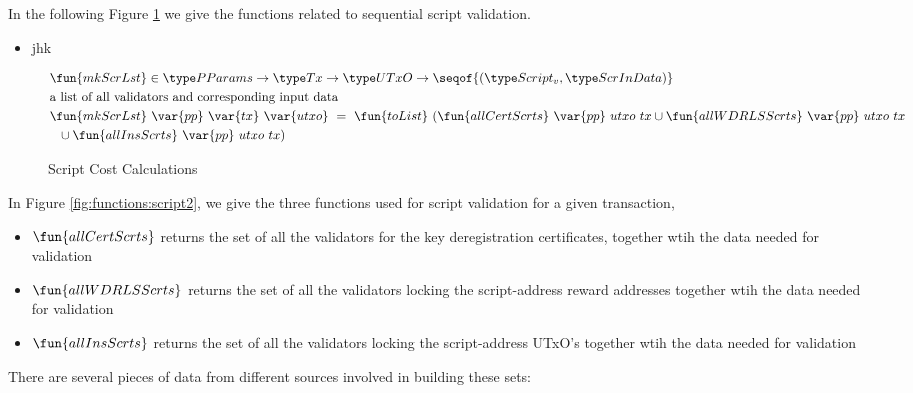 \clearpage

In the following Figure \ref{fig:functions:script1} we give the functions
related to sequential script validation.

\begin{itemize}
\item jhk
\end{itemize}

\begin{figure}[htb]
  \begin{align*}
    & \fun{mkScrLst} \in \PParams \to \Tx \to \UTxO \to \seqof{(\ScriptV,\ScrInData)} \\
    & \text{a list of all validators and corresponding input data} \\
    & \fun{mkScrLst} ~\var{pp}~\var{tx}~ \var{utxo} ~=~
    \fun{toList}~(\fun{allCertScrts}~\var{pp}~{utxo}~{tx} \cup \fun{allWDRLSScrts}~\var{pp}~{utxo}~{tx} \\
    & ~~ \cup \fun{allInsScrts}~\var{pp}~{utxo}~{tx}) \\
  \end{align*}
  \caption{Script Cost Calculations}
  \label{fig:functions:script1}
\end{figure}

In Figure \ref{fig:functions:script2}, we give the three functions
used for script validation for a given transaction,

\begin{itemize}
\item $\fun{allCertScrts}$ returns the set of all the validators for the
key deregistration certificates, together
wtih the data needed for validation
\item $\fun{allWDRLSScrts}$ returns the set of all the validators locking
the script-address reward addresses together
wtih the data needed for validation
\item $\fun{allInsScrts}$ returns the set of all the validators locking
the script-address UTxO's together
wtih the data needed for validation
\end{itemize}

There are several pieces of data from different sources involved in building these
sets:

